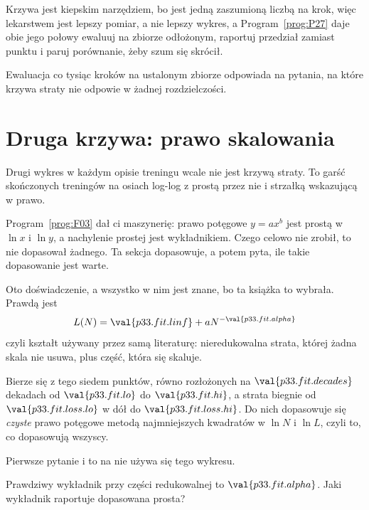 \begin{fr}
\begin{aibox}
Krzywa jest kiepskim narzędziem, bo jest jedną zaszumioną liczbą na krok, więc
lekarstwem jest lepszy pomiar, a nie lepszy wykres, a
Program~\ref{prog:P27} daje obie jego połowy \dash{} ewaluuj na zbiorze
odłożonym, raportuj przedział zamiast punktu i paruj porównanie, żeby szum się
skrócił.

Ewaluacja co tysiąc kroków na ustalonym zbiorze odpowiada na pytania, na które
krzywa straty nie odpowie w żadnej rozdzielczości.
\end{aibox}
\end{fr}

\section{Druga krzywa: prawo skalowania}
\label{sec:P33-scaling}

\begin{fr}
Drugi wykres w każdym opisie treningu wcale nie jest krzywą straty. To garść
skończonych treningów na osiach log-log z prostą przez nie i strzałką
wskazującą w prawo.

Program~\ref{prog:F03} dał ci maszynerię: prawo potęgowe $y = ax^{b}$ jest
prostą w $\ln x$ i $\ln y$, a nachylenie prostej jest wykładnikiem. Czego
celowo nie zrobił, to nie dopasował żadnego. Ta sekcja dopasowuje, a potem
pyta, ile takie dopasowanie jest warte.
\end{fr}

\begin{fr}
Oto doświadczenie, a wszystko w nim jest znane, bo ta książka to wybrała.
Prawdą jest
\[ L(N) = \val{p33.fit.linf} + a N^{-\val{p33.fit.alpha}} \]
czyli kształt używany przez samą literaturę: nieredukowalna strata, której
żadna skala nie usuwa, plus część, która się skaluje.

Bierze się z tego siedem punktów, równo rozłożonych na
$\val{p33.fit.decades}$ dekadach od $\val{p33.fit.lo}$ do
$\val{p33.fit.hi}$, a strata biegnie od $\val{p33.fit.loss.lo}$ w dół do
$\val{p33.fit.loss.hi}$. Do nich dopasowuje się \emph{czyste} prawo potęgowe
metodą najmniejszych kwadratów w $\ln N$ i $\ln L$, czyli to, co dopasowują
wszyscy.
\end{fr}

\begin{fr}
Pierwsze pytanie i to na nie używa się tego wykresu.

Prawdziwy wykładnik przy części redukowalnej to $\val{p33.fit.alpha}$. Jaki
wykładnik raportuje dopasowana prosta?
\dotline
\nextframe
\end{fr}

